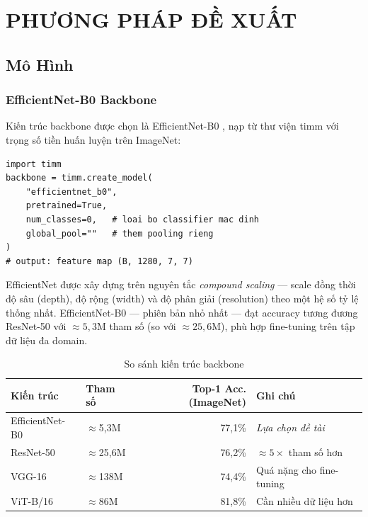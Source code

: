 \chapter{PHƯƠNG PHÁP ĐỀ XUẤT}

\section{Mô Hình}

\subsection{EfficientNet-B0 Backbone}

Kiến trúc backbone được chọn là EfficientNet-B0 \cite{tan2019efficientnet}, nạp từ thư viện timm \cite{wightman2019timm} với trọng số tiền huấn luyện trên ImageNet:

\begin{lstlisting}[style=python, caption={Khởi tạo EfficientNet-B0 backbone}]
import timm
backbone = timm.create_model(
    "efficientnet_b0",
    pretrained=True,
    num_classes=0,   # loai bo classifier mac dinh
    global_pool=""   # them pooling rieng
)
# output: feature map (B, 1280, 7, 7)
\end{lstlisting}

EfficientNet được xây dựng trên nguyên tắc \textit{compound scaling} --- scale đồng thời độ sâu (depth), độ rộng (width) và độ phân giải (resolution) theo một hệ số tỷ lệ thống nhất. EfficientNet-B0 --- phiên bản nhỏ nhất --- đạt accuracy tương đương ResNet-50 với $\approx 5{,}3$M tham số (so với $\approx 25{,}6$M), phù hợp fine-tuning trên tập dữ liệu đa domain.

\begin{table}[H]
  \centering
  \caption{So sánh kiến trúc backbone}
  \label{tab:backbone_compare}
  \begin{tabular}{llrl}
    \toprule
    \textbf{Kiến trúc} & \textbf{Tham số} & \textbf{Top-1 Acc. (ImageNet)} & \textbf{Ghi chú} \\
    \midrule
    EfficientNet-B0 & $\approx$5,3M & 77,1\% & \textit{Lựa chọn đề tài} \\
    ResNet-50       & $\approx$25,6M & 76,2\% & $\approx 5\times$ tham số hơn \\
    VGG-16          & $\approx$138M  & 74,4\% & Quá nặng cho fine-tuning \\
    ViT-B/16        & $\approx$86M   & 81,8\% & Cần nhiều dữ liệu hơn \\
    \bottomrule
  \end{tabular}
\end{table}

